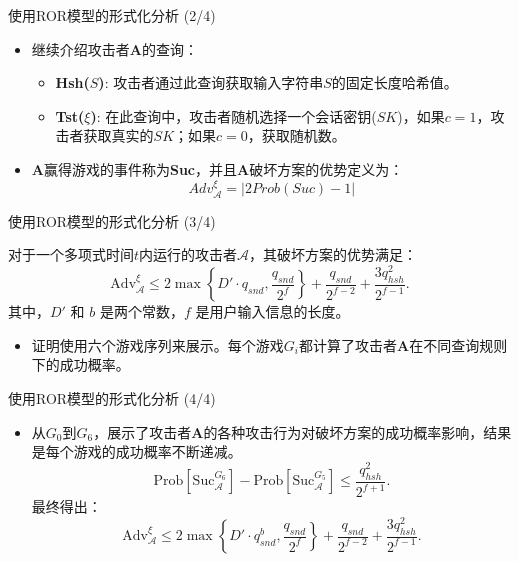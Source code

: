 \documentclass{beamer}
\begin{document}
\begin{frame}{使用ROR模型的形式化分析 (2/4)}
    \begin{itemize}
        \item 继续介绍攻击者\textbf{A}的查询：
        \begin{itemize}
            \item \textbf{Hsh($S$)}: 攻击者通过此查询获取输入字符串$S$的固定长度哈希值。
            \item \textbf{Tst($\xi$)}: 在此查询中，攻击者随机选择一个会话密钥($SK$)，如果$c=1$，攻击者获取真实的$SK$；如果$c=0$，获取随机数。
        \end{itemize}
        \item \textbf{A}赢得游戏的事件称为\textbf{Suc}，并且\textbf{A}破坏方案的优势定义为：
        \[
        Adv^\xi_{\mathcal{A}} = |2Prob(Suc) - 1|
        \]
    \end{itemize}
\end{frame}

\begin{frame}{使用ROR模型的形式化分析 (3/4)}
    \begin{theorem}
        对于一个多项式时间$t$内运行的攻击者$\mathcal{A}$，其破坏方案的优势满足：
        \[
\text{Adv}_{\mathcal{A}}^{\xi} \leq 2 \max \left\{ D' \cdot q_{snd}, \frac{q_{snd}}{2^f} \right\} + \frac{q_{snd}}{2^{f-2}} + \frac{3q_{hsh}^2}{2^{f-1}}.
\]
        其中，$D'$ 和 $b$ 是两个常数，$f$ 是用户输入信息的长度。
    \end{theorem}
    
    \begin{itemize}
        \item 证明使用六个游戏序列来展示。每个游戏$G_i$都计算了攻击者\textbf{A}在不同查询规则下的成功概率。
    \end{itemize}
\end{frame}

\begin{frame}{使用ROR模型的形式化分析 (4/4)}
    \begin{itemize}
        \item 从$G_0$到$G_6$，展示了攻击者\textbf{A}的各种攻击行为对破坏方案的成功概率影响，结果是每个游戏的成功概率不断递减。
        \[
\text{Prob} \left[ \text{Suc}_{\mathcal{A}}^{G_6} \right] - \text{Prob} \left[ \text{Suc}_{\mathcal{A}}^{G_5} \right] \leq \frac{q_{hsh}^2}{2^{f+1}}.
\]
        最终得出：
        \[
\text{Adv}^{\xi}_{\mathcal{A}} \leq 2 \max \left\{ D' \cdot q_{snd}^{b}, \frac{q_{snd}}{2^f} \right\} + \frac{q_{snd}}{2^{f-2}} + \frac{3q_{hsh}^2}{2^{f-1}}.
\]
    \end{itemize}
\end{frame}
\end{document}
